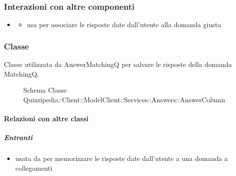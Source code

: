 \subsubsection{Interazioni con altre componenti}
\begin{itemize}
\item {}
\begin{itemize}
\item usa  per associare le risposte date dall'utente alla domanda giusta
\end{itemize}
\end{itemize}
\subsubsection{Classe }
Classe utilizzata da AnswerMatchingQ per salvare le risposte della domanda MatchingQ.
\begin{figure}[H]
\centering
\noindent{}
\caption[Schema Classe AnswerColumn]{Schema Classe Quizzipedia::Client::ModelClient::Services::Answers::AnswerColumn}
\end{figure}
\paragraph{Relazioni con altre classi}
\subparagraph{Entranti}
\begin{itemize}
\item usata da  per memorizzare le risposte date dall'utente a una domanda a collegamenti
\end{itemize}

